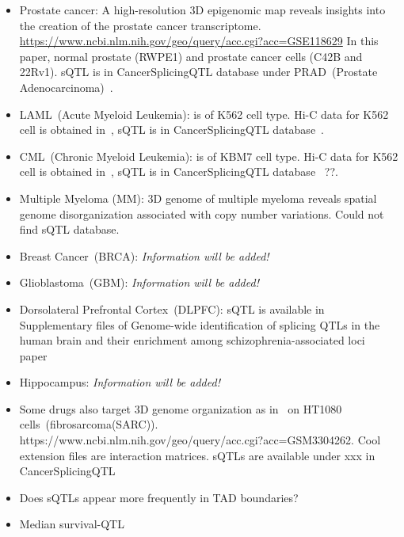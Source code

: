 \documentclass[11pt]{article}
\begin{document}
\begin{itemize}
\item Prostate cancer: A high-resolution 3D epigenomic map reveals insights into the creation
of the prostate cancer transcriptome. \url{https://www.ncbi.nlm.nih.gov/geo/query/acc.cgi?acc=GSE118629}
In this paper, normal prostate (RWPE1) and prostate cancer cells (C42B
and 22Rv1). sQTL is in CancerSplicingQTL database under PRAD~(Prostate Adenocarcinoma)~\cite{tian2018}.
\vspace{0.1cm}
\item LAML~(Acute Myeloid Leukemia): is of K562 cell type. Hi-C data for K562 cell is obtained in~\cite{rao2014}, sQTL is in CancerSplicingQTL database~\cite{tian2018}.
\vspace{0.1cm}
\item CML~(Chronic Myeloid Leukemia): is of KBM7 cell type. Hi-C data
  for K562 cell is obtained in~\cite{rao2014}, sQTL is in
  CancerSplicingQTL database~\cite{tian2018} ??.
\vspace{0.1cm}
\item Multiple Myeloma (MM): $3$D genome of multiple myeloma reveals
  spatial genome disorganization associated with copy number
  variations. Could not find sQTL database.
\vspace{0.1cm}
\item Breast Cancer~(BRCA): \textit{Information will be added!}
\vspace{0.1cm}
\item Glioblastoma~(GBM): \textit{Information will be added!}
\vspace{0.1cm}
\item Dorsolateral Prefrontal Cortex~(DLPFC): sQTL is available in
  Supplementary files of Genome-wide identification of splicing QTLs
  in the human brain and their enrichment among
  schizophrenia-associated loci paper~\cite{takata2017}
\vspace{0.1cm}
\item Hippocampus: \textit{Information will be added!}
\vspace{0.1cm}
\item Some drugs also target $3$D genome organization as
in~\cite{kantidze2019} on HT1080
cells~(fibrosarcoma(SARC)). https://www.ncbi.nlm.nih.gov/geo/query/acc.cgi?acc=GSM3304262. Cool extension
files are interaction matrices. sQTLs are available under xxx in
CancerSplicingQTL
\end{itemize}

\begin{itemize}
\item Does sQTLs appear more frequently in TAD boundaries?
\vspace{0.1cm}
\item Median survival-QTL
\end{itemize}




\end{document}
